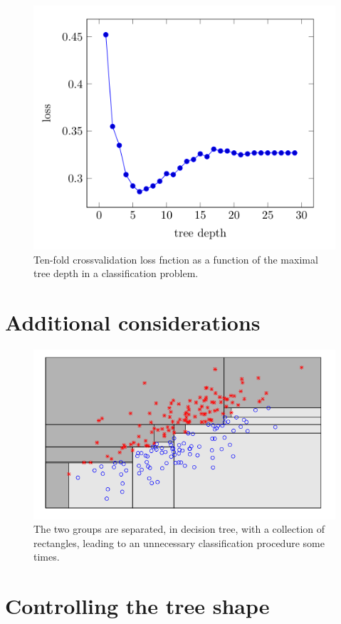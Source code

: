 \documentclass{beamer}
\begin{document}
\begin{frame}
    \begin{figure}
        \includegraphics[width=0.7\linewidth]{F84Kroese}
        \caption{Ten-fold crossvalidation loss fnction as a function of the maximal tree depth in a classification problem.\cite{kroese2020}}
    \end{figure}
\end{frame}

\section{Additional considerations}

\begin{frame}
    \begin{figure}
        \includegraphics[width=0.9\linewidth]{F85Kroese}
        \caption{The two groups are separated, in decision tree, with a collection of rectangles, leading to an unnecessary classification procedure some times.\cite{kroese2020}}
    \end{figure}
\end{frame}

\section{Controlling the tree shape}
\end{document}
